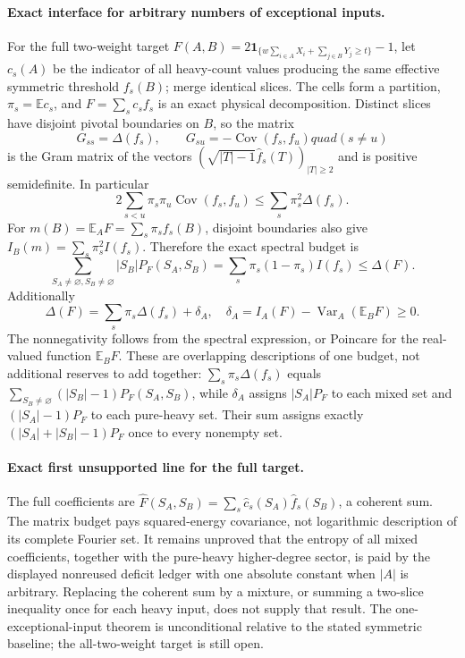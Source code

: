 \paragraph{Exact interface for arbitrary numbers of exceptional inputs.}
For the full two-weight target
$F(A,B)=2\mathbf1_{\{w\sum_{i\in A}X_i+\sum_{j\in B}Y_j\ge t\}}-1$,
let $c_s(A)$ be the indicator of all heavy-count values producing the
same effective symmetric threshold $f_s(B)$; merge identical slices.
The cells form a partition, $\pi_s=\mathbb E c_s$, and
$F=\sum_s c_s f_s$ is an exact physical decomposition.
Distinct slices have disjoint pivotal boundaries on $B$, so the matrix
\[
 G_{ss}=\Delta(f_s),\qquad G_{su}=-\operatorname{Cov}(f_s,f_u)quad(s\ne u)
\]
is the Gram matrix of the vectors
$(\sqrt{|T|-1}\widehat f_s(T))_{|T|\ge2}$ and is positive semidefinite.
In particular
\begin{equation}\label{a041s2:matrix}
 2\sum_{s<u}\pi_s\pi_u\operatorname{Cov}(f_s,f_u)
 \le\sum_s\pi_s^2\Delta(f_s).
\end{equation}
For $m(B)=\mathbb E_A F=\sum_s\pi_sf_s(B)$, disjoint boundaries also give
$I_B(m)=\sum_s\pi_s^2I(f_s)$. Therefore the exact spectral budget is
\begin{equation}\label{a041s2:mixed}
 \sum_{S_A\ne\varnothing,S_B\ne\varnothing}|S_B|P_F(S_A,S_B)
 =\sum_s\pi_s(1-\pi_s)I(f_s)\le\Delta(F).
\end{equation}
Additionally
\[
 \Delta(F)=\sum_s\pi_s\Delta(f_s)+\delta_A,\quad
 \delta_A=I_A(F)-\operatorname{Var}_A(\mathbb E_BF)\ge0.
\]
The nonnegativity follows from the spectral expression, or Poincare
for the real-valued function $\mathbb E_BF$.
These are overlapping descriptions of one budget, not additional
reserves to add together: $\sum_s\pi_s\Delta(f_s)$ equals
$\sum_{S_B\ne\varnothing}(|S_B|-1)P_F(S_A,S_B)$, while
$\delta_A$ assigns $|S_A|P_F$ to each mixed set and
$(|S_A|-1)P_F$ to each pure-heavy set. Their sum assigns exactly
$(|S_A|+|S_B|-1)P_F$ once to every nonempty set.

\paragraph{Exact first unsupported line for the full target.}
The full coefficients are
$\widehat F(S_A,S_B)=\sum_s\widehat c_s(S_A)\widehat f_s(S_B)$,
a coherent sum. The matrix budget pays squared-energy covariance, not
logarithmic description of its complete Fourier set. It remains
unproved that the entropy of all mixed coefficients, together with the
pure-heavy higher-degree sector, is paid by the displayed nonreused
deficit ledger with one absolute constant when $|A|$ is arbitrary.
Replacing the coherent sum by a mixture, or summing a two-slice
inequality once for each heavy input, does not supply that result.
The one-exceptional-input theorem is unconditional relative to the
stated symmetric baseline; the all-two-weight target is still open.
